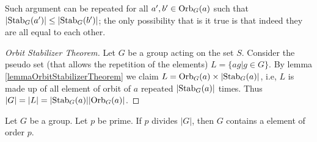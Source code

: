 \documentclass[../note.tex]{subfiles}
\begin{document}
Such argument can be repeated for all $a',b' \in \text{Orb}_{G}({a})$ such that $|\text{Stab}_{G}({a'})| \leq |\text{Stab}_{G}({b'})|$; the only possibility that is it true is that indeed they are all equal to each other.

\begin{proof}[Orbit Stabilizer Theorem]
	Let $G$ be a group acting on the set $S$. 
	Consider the pseudo set (that allows the repetition of the elements) $L=\{ag| g\in G\}$. 
	By lemma \ref{lemmaOrbitStabilizerTheorem} we claim $L=\text{Orb}_{G}({a}) \times |\text{Stab}_{G}({a})|$, i.e, $L$ is made up of all element of orbit of $a$ repeated $|\text{Stab}_{G}({a})|$ times. Thus $|G|=|L|=|\text{Stab}_{G}({a})||\text{Orb}_{G}({a})|$.
\end{proof}

\begin{theorem}
	Let $G$ be a group. Let $p$ be prime. If $p$ divides $|G|$, then $G$ contains a element of order $p$.
\end{theorem}
\end{document}
